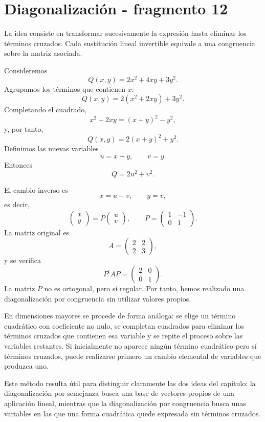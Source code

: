 \section{Diagonalización - fragmento 12}
La idea consiste en transformar sucesivamente la expresión hasta eliminar los términos cruzados. Cada sustitución lineal invertible equivale a una congruencia sobre la matriz asociada.

\begin{example}
Consideremos
\[
Q(x,y)=2x^2+4xy+3y^2.
\]
Agrupamos los términos que contienen $x$:
\[
Q(x,y)=2(x^2+2xy)+3y^2.
\]
Completando el cuadrado,
\[
x^2+2xy=(x+y)^2-y^2,
\]
y, por tanto,
\[
Q(x,y)=2(x+y)^2+y^2.
\]
Definimos las nuevas variables
\[
u=x+y,
\qquad
v=y.
\]
Entonces
\[
\boxed{Q=2u^2+v^2.}
\]

El cambio inverso es
\[
x=u-v,
\qquad
y=v,
\]
es decir,
\[
\begin{pmatrix}x\\y\end{pmatrix}
=
P\begin{pmatrix}u\\v\end{pmatrix},
\qquad
P=\begin{pmatrix}1&-1\\0&1\end{pmatrix}.
\]
La matriz original es
\[
A=\begin{pmatrix}2&2\\2&3\end{pmatrix},
\]
y se verifica
\[
P^tAP=
\begin{pmatrix}2&0\\0&1\end{pmatrix}.
\]
La matriz $P$ no es ortogonal, pero sí regular. Por tanto, hemos realizado una diagonalización por congruencia sin utilizar valores propios.
\end{example}

En dimensiones mayores se procede de forma análoga: se elige un término cuadrático con coeficiente no nulo, se completan cuadrados para eliminar los términos cruzados que contienen esa variable y se repite el proceso sobre las variables restantes. Si inicialmente no aparece ningún término cuadrático pero sí términos cruzados, puede realizarse primero un cambio elemental de variables que produzca uno.

Este método resulta útil para distinguir claramente las dos ideas del capítulo: la diagonalización por semejanza busca una base de vectores propios de una aplicación lineal, mientras que la diagonalización por congruencia busca unas variables en las que una forma cuadrática quede expresada sin términos cruzados.

